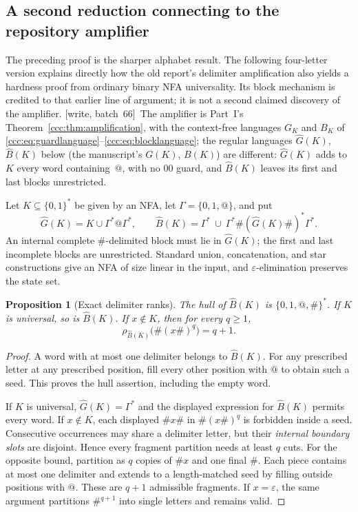 \documentclass[11pt,letterpaper]{article}
\newtheorem{proposition}[theorem]{Proposition}
\theoremstyle{definition}
\theoremstyle{remark}
\newcommand{\eps}{\varepsilon}
\newcommand{\rank}{\rho}
\newcommand{\wsix}{\textup{[write, batch~66]}}
\begin{document}
\subsection{A second reduction connecting to the repository amplifier}

The preceding proof is the sharper alphabet result. The following
four-letter version explains directly how the old report's delimiter
amplification also yields a hardness proof from ordinary binary NFA
universality. Its block mechanism is credited to that earlier line of
argument; it is not a second claimed discovery of the amplifier.
\wsix\ The amplifier is Part~I's Theorem~\ref{ccc:thm:amplification}, with
the context-free languages $G_K$ and $B_K$ of
\eqref{ccc:eq:guardlanguage}--\eqref{ccc:eq:blocklanguage}; the regular
languages $\widehat G(K)$, $\widehat B(K)$ below (the manuscript's $G(K)$,
$B(K)$) are different: $\widehat G(K)$ adds to $K$ every word containing~$@$,
with no $00$ guard, and $\widehat B(K)$ leaves its first and last blocks
unrestricted.

Let $K\subseteq\{0,1\}^*$ be given by an NFA, let
$\Gamma=\{0,1,@\}$, and put
\[
 \widehat G(K)=K\cup\Gamma^*@\Gamma^*,\qquad
 \widehat B(K)=\Gamma^*\ \cup\ \Gamma^*\#(\widehat G(K)\#)^*\Gamma^*.
\]
An internal complete $\#$-delimited block must lie in $\widehat G(K)$; the first
and last incomplete blocks are unrestricted. Standard union, concatenation,
and star constructions give an NFA of size linear in the input, and
$\eps$-elimination preserves the state set.

\begin{proposition}[Exact delimiter ranks]\label{ccc:ps:prop:delimiter}
The hull of $\widehat B(K)$ is $\{0,1,@,\#\}^*$. If $K$ is universal, so is
$\widehat B(K)$. If $x\notin K$, then for every $q\ge1$,
\[
 \rank_{\widehat B(K)}\bigl(\#(x\#)^q\bigr)=q+1.
\]
\end{proposition}
\begin{proof}
A word with at most one delimiter belongs to $\widehat B(K)$. For any prescribed
letter at any prescribed position, fill every other position with $@$
to obtain such a seed. This proves the hull assertion, including the
empty word.

If $K$ is universal, $\widehat G(K)=\Gamma^*$ and the displayed expression for
$\widehat B(K)$ permits every word. If $x\notin K$, each displayed $\#x\#$ in
$\#(x\#)^q$ is forbidden inside a seed. Consecutive occurrences may
share a delimiter letter, but their \emph{internal boundary slots} are
disjoint. Hence every fragment partition needs at least $q$ cuts.
For the opposite bound, partition as $q$ copies of $\#x$ and one final
$\#$. Each piece contains at most one delimiter and extends to a
length-matched seed by filling outside positions with $@$. These are
$q+1$ admissible fragments. If $x=\eps$, the same argument partitions
$\#^{q+1}$ into single letters and remains valid.
\end{proof}
\end{document}
